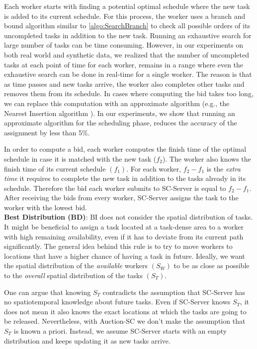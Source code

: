 Each worker starts with finding a potential optimal schedule where the new task is added to its current schedule. For this process, the worker uses a branch and bound algorithm similar to \cref{algo:SearchBranch} to check all possible orders of its uncompleted tasks in addition to the new task. Running an exhaustive search for large number of tasks can be time consuming. However, in our experiments on both real world and synthetic data, we realized that the number of uncompleted tasks at each point of time for each worker, remains in a range where even the exhaustive search can be done in real-time for a single worker. The reason is that as time passes and new tasks arrive, the worker also completes other tasks and removes them from its schedule. In cases where computing the bid takes too long, we can replace this computation with an approximate algorithm (e.g., the Nearest Insertion algorithm \cite{Rosenkrantz74}). In our experiments, we show that running an approximate algorithm for the scheduling phase, reduces the accuracy of the assignment by less than 5\%.

In order to compute a bid, each worker computes the finish time of the optimal schedule in case it is matched with the new task ($f_2$). The worker also knows the finish time of its current schedule $(f_1)$. For each worker, $f_2-f_1$ is the \textit{extra time} it requires to complete the new task in addition to the tasks already in its schedule. Therefore the bid each worker submits to SC-Server is equal to $f_2 - f_1$. After receiving the bids from every worker, SC-Server assigns the task to the worker with the lowest bid.\\

\noindent \textbf{Best Distribution (BD)}: 
BI does not consider the spatial distribution of tasks. It might be beneficial to assign a task located at a task-dense area to a worker with high remaining availability, even if it has to deviate from its current path significantly. The general idea behind this rule is to try to move workers to locations that have a higher chance of having a task in future. Ideally, we want the spatial distribution of the \textit{available} workers $(S_W)$ to be as close as possible to the \textit{overall} spatial distribution of the tasks $(S_T)$.

One can argue that knowing $S_T$ contradicts the assumption that SC-Server has no spatiotemporal knowledge about future tasks. Even if SC-Server knows $S_T$, it does not mean it also knows the exact locations at which the tasks are going to be released. Nevertheless, with Auction-SC we don't make the assumption that $S_T$ is known a priori. Instead, we assume SC-Server starts with an empty distribution and keeps updating it as new tasks arrive.

